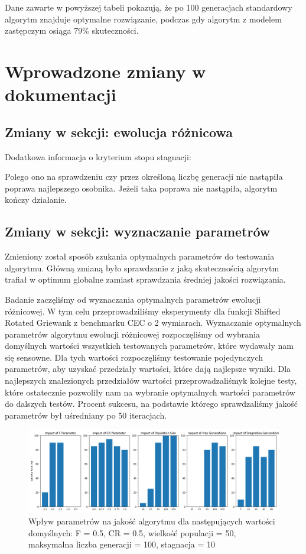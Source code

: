 \documentclass{article}
\begin{document}
Dane zawarte w powyższej tabeli pokazują, że po 100 generacjach standardowy algorytm znajduje optymalne rozwiązanie, podczas gdy algorytm z modelem zastępczym osiąga 79\% skuteczności. 

\section{Wprowadzone zmiany w dokumentacji}

\subsection{Zmiany w sekcji: ewolucja różnicowa}

Dodatkowa informacja o kryterium stopu stagnacji:

Polego ono na sprawdzeniu czy przez określoną liczbę generacji nie nastąpiła poprawa najlepszego osobnika. Jeżeli taka poprawa nie nastąpiła, algorytm kończy działanie.

\subsection{Zmiany w sekcji: wyznaczanie parametrów}

Zmieniony został sposób szukania optymalnych parametrów do testowania algorytmu. Główną zmianą było sprawdzanie z jaką skutecznością algorytm trafiał w optimum globalne zamiast sprawdzania średniej jakości rozwiązania.


Badanie zaczęliśmy od wyznaczania optymalnych parametrów ewolucji różnicowej. W tym celu przeprowadziliśmy eksperymenty dla funkcji Shifted Rotated Griewank z benchmarku CEC o 2 wymiarach. Wyznaczanie optymalnych parametrów algorytmu ewolucji różnicowej rozpoczęliśmy od wybrania domyślnych wartości wszystkich testowanych parametrów, które wydawały nam się sensowne. Dla tych wartości rozpoczęliśmy testowanie pojedynczych parametrów, aby uzyskać przedziały wartości, które dają najlepsze wyniki. Dla najlepszych znalezionych przedziałów wartości przeprowadzaliśmyk kolejne testy, które ostatecznie pozwoliły nam na wybranie optymalnych wartości parametrów do dalszych testów. Procent sukcesu, na podstawie którego sprawdzaliśmy jakość parametrów był uśredniany po 50 iteracjach. 

\begin{figure}[H]
    \centering
    \includegraphics[width=\textwidth]{parameter_tuning_results_separate1.png}
    \caption{Wpływ parametrów na jakość algorytmu dla następujących wartości domyślnych: F = 0.5, CR = 0.5, wielkość populacji = 50, maksymalna liczba generacji = 100, stagnacja = 10}
    \label{fig:parameter_results1}
\end{figure}
\end{document}

